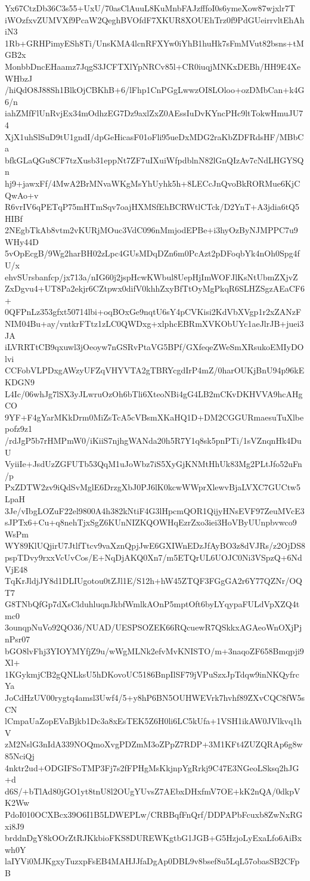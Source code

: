 Yx67CtzDb36C3s55+UxU/70asClAuuL8KuMnbFAJzfffoI0s6ymeXow87wjxlr7T
iWOzfxvZUMVXf9PcaW2QeghBVOfdF7XKUR8XOUEhTrz0f9PdGUeirrvltEhAhiN3
1Rb+GRHPimyESh8Ti/UnsKMA4lcnRFXYw0iYhB1huHk7sFmMVut82bsns+tMGB2x
MonbbDncEHaamz7JqgS3JCFTXlYpNRCv85l+CR0iuqjMNKxDEBh/HH9E4XeWHbzJ
/hiQdO8J88Sh1BlkOjCBKhB+6/lFhp1CnPGgLwwzOI8LOloo+ozDMbCan+k4G6/n
iahZMfFlUnRvjEx34mOdhzEG7Dz9axlZxZ0AEssIuDvKYncPHc9ltTokwHmuJU74
XjX1uhSlSuD9tU1gndI/dpGeHicasF01oFli95ueDxMDG2raKbZDFRdsHF/MBbCa
bfkGLaQGu8CF7tzXusb31eppNt7ZF7uIXuiWfpdblnN82lGnQIzAv7cNdLHGYSQn
hj9+jawxFf/4MwA2BrMNvaWKgMsYhUyhk5h+8LECcJnQvoBkRORMue6KjCQwAo+v
R6vrIV6qPETqP75mHTmSqv7oajHXMSfEhBCRWtlCTck/D2YnT+A3jdia6tQ5HIBf
2NEgbTkAb8vtm2vKURjMOuc3VdC096nMmjodEPBe+i3hyOzByNJMPPC7u9WHy44D
5vOpEcgB/9Wg2harBH02zLpc4GUsMDqDZn6m0PcAzt2pDFoqbYk4nOh0Spg4fU/x
ehvSUrsbanfcp/jx713a/nIG60j2jspHcwKWbul8UepHjImWOFJlKsNtUbmZXjvZ
ZxDgvu4+UT8Pa2ekjr6CZtpwx0difV0khhZxyBfTtOyMgPkqR6SLHZSgzAEaCF6+
0QFPnLz353gfxt50714lbi+oqBOxGe9nqtU6sY4pCVKisi2KdVbXVgp1r2xZANzF
NIM04Bu+ay/vntkrFTtz1zLC0QWDxg+xlphcEBRmXVKObUYc1aeJlrJB+juei3JA
iLVRRTtCB9qxuwl3jOeoyw7nGSRvPtaVG5BPf/GXfeqeZWeSmXRsukoEMIyDOlvi
CCFobVLPDxgAWzyUFZqVHYVTA2gTBRYcgdIrP4mZ/0harOUKjBnU94p96kEKDGN9
L4Ic/06whJg7lSX3yJLwruOzOh6bTli6XteoNBi4gG4LB2mCKvDKHVVA9hcAHgCO
9YF+F4gYarMKkDrm0MiZsTcA5cVBsmXKaHQ1D+DM2CGGURmaesuTuXlbepofz9z1
/rdJgP5b7rHMPmW0/iKiiS7njhgWANda20h5R7Y1q8sk5pnPTi/1sVZnqnHk4DuU
VyiiIe+JsdUzZGFUTb53QqM1uJoWbz7iS5XyGjKNMtHhUk83Mg2PLtJfo52uFn/p
PxZDTW2zv9iQdSvMglE6DrzgXbJ0PJ6lK0kcwWWprXlewvBjaLVXC7GUCtw5LpaH
3Je/vIbgLOZuF22el9800A4h382kNtiF4G3lHpcmQOR1QijyHNsEVF97ZeuMVcE3
sJPTx6+Cu+q8nehTjxSgZ6KUnNIZKQOWHqEzrZxo3iei3HoVByUUnpbvwco9WsPm
WY89KlUQjirU7JtlfTtcv9vaXznQpjJwE6GXIWnEDzJfAyBO3z8dVJRs/z2OjDS8
pspTDvy9rxxVcUvCos/E+NqDjAKQ0Xn7/m5ETQrUL6UOJC0Ni3VSpzQ+6NdVjE48
TqKrJldjJY8d1DLIUgotou0tZJl1E/S12h+hW45ZTQF3FGgGA2r6Y77QZNr/OQT7
G8TNbQfGp7dXsClduhluqnJkbfWmlkAOnP5mptOft6byLYqypaFULdVpXZQ4tmc0
3ounqpNuVo92QO36/NUAD/UESPSOZEK66RQcuewR7QSkkxAGAeoWnOXjPjnPsr07
bGO8lvFhj3YIOYMYfjZ9u/wWgMLNk2efvMvKNISTO/m+3naqoZF658Bmqpji9Xl+
1KGykmjCB2gQNLksU5hDKovoUC5186BnpIlSF79jVPuSzxJpTdqw9inNKQyfrcYa
JoCdHzUV00rygtq4amsl3Uwf4/5+y8hP6BN5OUHWEVrk7hvhf89ZXvCQC8fW5sCN
lCmpaUaZopEVaBjkb1Dc3a8xEsTEK5Z6H0li6LC5kUfa+1VSH1ikAW0JVlkvq1hV
zM2NslG3nIdA339NOQmoXvgPDZmM3oZPpZ7RDP+3M1KFt4ZUZQRAp6g8w85NciQj
4nktr2ud+ODGIFSoTMP3Fj7s2fFPHgMsKkjnpYgRrkj9C47E3NGeoLSksq2hJG+d
d6S/+bTlAd80jGO1yt8tnU8l2OUgYUvsZ7AEbxDHxfmV7OE+kK2nQA/0dkpVK2Ww
PdoI010OCXBcx39O6I1B5LDWEPLw/CRBBqfFnQrf/DDPAPbFcuxb8ZwNxRGxi8J9
brddnDgY8kOOrZtRJKkbioFKS8DUREWKgtbG1JGB+G5HzjoLyExaLfo6AiBxwh0Y
laIYVi0MJKgxyTuzxpFsEB4MAHJJfaDgAp0DBL9v8bsef8u5LqL57obasSB2CFpB
